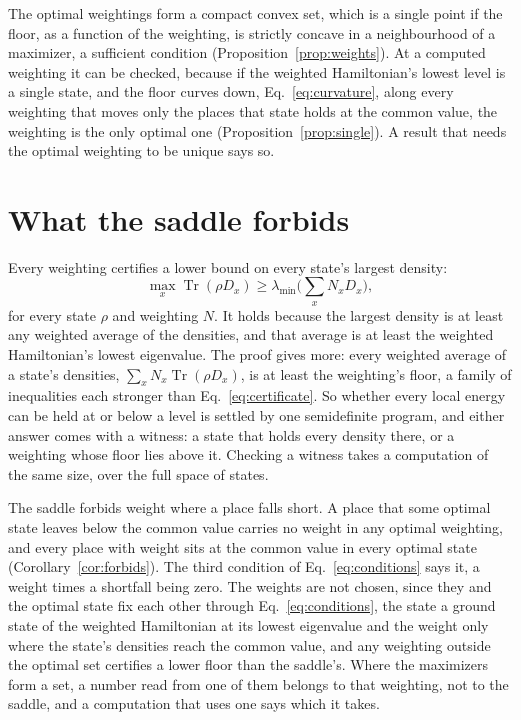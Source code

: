 \documentclass[aps,prd,reprint,superscriptaddress]{revtex4-2}
\begin{document}
The optimal weightings form a compact convex set, which is a single point if the floor, as a function of the weighting, is strictly concave in a neighbourhood of a maximizer, a sufficient condition (Proposition~\ref{prop:weights}). At a computed weighting it can be checked, because if the weighted Hamiltonian's lowest level is a single state, and the floor curves down, Eq.~\eqref{eq:curvature}, along every weighting that moves only the places that state holds at the common value, the weighting is the only optimal one (Proposition~\ref{prop:single}). A result that needs the optimal weighting to be unique says so.

\section{What the saddle forbids}
\label{sec:forbids}

Every weighting certifies a lower bound on every state's largest density:
\begin{equation}
  \max_x \operatorname{Tr}(\rho D_x) \ge \lambda_{\min}\Big(\sum_x N_x D_x\Big),
  \label{eq:certificate}
\end{equation}
for every state $\rho$ and weighting $N$. It holds because the largest density is at least any weighted average of the densities, and that average is at least the weighted Hamiltonian's lowest eigenvalue. The proof gives more: every weighted average of a state's densities, $\sum_x N_x \operatorname{Tr}(\rho D_x)$, is at least the weighting's floor, a family of inequalities each stronger than Eq.~\eqref{eq:certificate}. So whether every local energy can be held at or below a level is settled by one semidefinite program, and either answer comes with a witness: a state that holds every density there, or a weighting whose floor lies above it. Checking a witness takes a computation of the same size, over the full space of states.

The saddle forbids weight where a place falls short. A place that some optimal state leaves below the common value carries no weight in any optimal weighting, and every place with weight sits at the common value in every optimal state (Corollary~\ref{cor:forbids}). The third condition of Eq.~\eqref{eq:conditions} says it, a weight times a shortfall being zero. The weights are not chosen, since they and the optimal state fix each other through Eq.~\eqref{eq:conditions}, the state a ground state of the weighted Hamiltonian at its lowest eigenvalue and the weight only where the state's densities reach the common value, and any weighting outside the optimal set certifies a lower floor than the saddle's. Where the maximizers form a set, a number read from one of them belongs to that weighting, not to the saddle, and a computation that uses one says which it takes.
\end{document}
